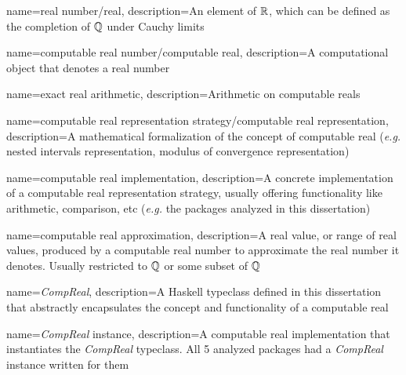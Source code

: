 







{
    name={real number/real},
    description={An element of $\mathbb{R}$, which can be defined as the completion of $\mathbb{Q}$ under Cauchy limits}
}

{
    name={computable real number/computable real},
    description={A computational object that denotes a real number}
}

{
    name={exact real arithmetic},
    description={Arithmetic on computable reals}
}

{
    name={computable real representation strategy/computable real representation},
    description={A mathematical formalization of the concept of computable real (\textit{e.g.} nested intervals representation, modulus of convergence representation)}
}

{
    name={computable real implementation},
    description={A concrete implementation of a computable real representation strategy, usually offering functionality like arithmetic, comparison, etc (\textit{e.g.} the packages analyzed in this dissertation)}
}

{
    name={computable real approximation},
    description={A real value, or range of real values, produced by a computable real number to approximate the real number it denotes. Usually restricted to $\mathbb{Q}$ or some subset of $\mathbb{Q}$}
}

{
    name={\textit{CompReal}},
    description={A Haskell typeclass defined in this dissertation that abstractly encapsulates the concept and functionality of a computable real}
}

{
    name={\textit{CompReal} instance},
    description={A computable real implementation that instantiates the \textit{CompReal} typeclass. All 5 analyzed packages had a \textit{CompReal} instance written for them}
}